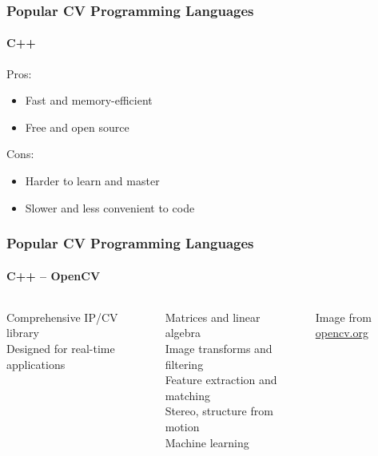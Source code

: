 \documentclass[xetex,professionalfont]{beamer}
\begin{document}

\begin{frame}
\frametitle{Popular CV Programming Languages}
\framesubtitle{C++}

Pros:
\begin{itemize}
	\item Fast and memory-efficient
	\item Free and open source
\end{itemize}

\bigskip
Cons:
\begin{itemize}
	\item Harder to learn and master
	\item Slower and less convenient to code
\end{itemize}

\end{frame}


\begin{frame}
\frametitle{Popular CV Programming Languages}
\framesubtitle{C++ -- OpenCV}

\begin{columns}

Comprehensive IP/CV library\\
Designed for real-time applications

\bigskip
Matrices and linear algebra\\\medskip
Image transforms and filtering\\\medskip
Feature extraction and matching\\\medskip
Stereo, structure from motion\\\medskip
Machine learning %


\begin{center}
{
	{\centering Image from \url{opencv.org}}}
\end{center}

\end{columns}

\end{frame}
\end{document}
